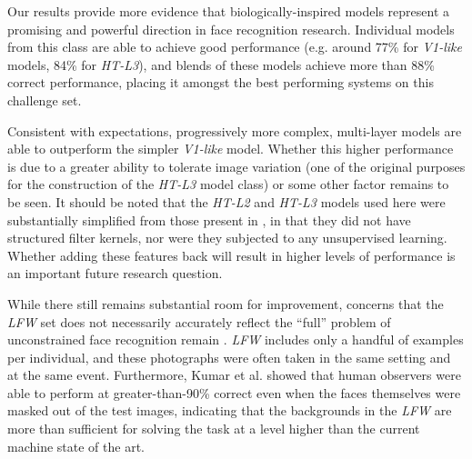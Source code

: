 
Our results provide more evidence that biologically-inspired models represent a promising
and powerful direction in face recognition research. Individual models from this
class are able to achieve good performance (e.g. around 77\% for \emph{V1-like} models,
84\% for \emph{HT-L3}), and blends of these models achieve more than 88\%
correct performance, placing it amongst the best performing systems on this challenge set.

Consistent with expectations, progressively more complex, multi-layer models are
able to outperform the simpler \emph{V1-like} model. Whether this higher
performance is due to a greater ability to tolerate image variation (one of the
original purposes for the construction of the \emph{HT-L3} model
class\cite{pinto:plos09}) or some other factor remains to be seen. It should be
noted that the \emph{HT-L2} and \emph{HT-L3} models used here were substantially
simplified from those present in \cite{pinto:plos09}, in that they did not have
structured filter kernels, nor were they subjected to any unsupervised learning.
Whether adding these features back will result in higher levels of performance
is an important future research question.

While there still remains substantial room for improvement, concerns that
the \emph{LFW} set does not necessarily accurately reflect the ``full'' problem
of unconstrained face recognition
remain \cite{pinto:eccv08,pinto:cvpr09,kumar:iccv09}.  \emph{LFW} includes only
a handful of examples per individual, and these photographs were often taken in
the same setting and at the same event.  Furthermore, Kumar et
al. \cite{kumar:iccv09} showed that human observers were able to perform at
greater-than-90\% correct even when the faces themselves were masked out of the
test images, indicating that the backgrounds in the \emph{LFW} are more than
sufficient for solving the task at a level higher than the current machine state
of the art.

